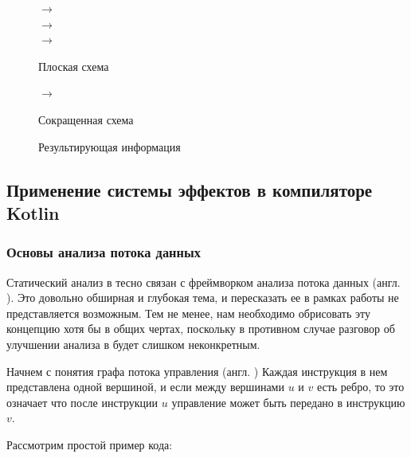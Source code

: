 \begin{figure}[h]
	{
		 $\rightarrow$  \\
		
		  $\rightarrow$  \\
		
		 $\rightarrow$ 
	}
	{}
	
	\caption{Плоская схема}
	\label{fig:flat-schema}
\end{figure}

\begin{figure}[h]
	{				
		 $\rightarrow$ 
	}
	{}
	
	\caption{Сокращенная схема}
	\label{fig:reduced-schema}
\end{figure}

\begin{figure}[h]
	
	\caption{Результирующая информация}
	\label{fig:info-holder}
\end{figure}

\newpage

\subsection{Применение системы эффектов в компиляторе Kotlin}

\subsubsection{Основы анализа потока данных}

Статический анализ в  тесно связан с фреймворком анализа потока данных (англ. ). Это довольно обширная и глубокая тема, и пересказать ее в рамках работы не представляется возможным. Тем не менее, нам необходимо обрисовать эту концепцию хотя бы в общих чертах, поскольку в противном случае разговор об улучшении анализа в  будет слишком неконкретным.

Начнем с понятия графа потока управления (англ. ) Каждая инструкция в нем представлена одной вершиной, и если между вершинами $u$ и $v$ есть ребро, то это означает что после инструкции $u$ управление может быть передано 
в инструкцию $v$. 

Рассмотрим простой пример кода:

